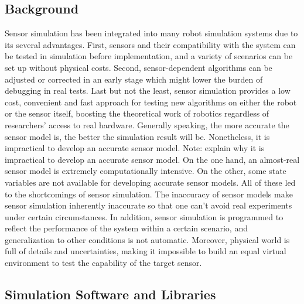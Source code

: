 \documentclass[twocolumn,10pt]{asme2ej}
\begin{document}
\subsection{Background}
Sensor simulation has been integrated into many robot simulation systems due to its several advantages. First, sensors and their compatibility with the system can be tested in simulation before implementation, and a variety of scenarios can be set up without physical costs. Second, sensor-dependent algorithms can be adjusted or corrected in an early stage which might lower the burden of debugging in real tests. Last but not the least, sensor simulation provides a low cost, convenient and fast approach for testing new algorithms on either the robot or the sensor itself, boosting the theoretical work of robotics regardless of researchers' access to real hardware. Generally speaking, the more accurate the sensor model is, the better the simulation result will be. Nonetheless, it is impractical to develop an accurate sensor model. {\color{red} Note: explain why it is impractical to develop an accurate sensor model.} On the one hand, an almost-real sensor model is extremely computationally intensive. On the other, some state variables are not available for developing accurate sensor models. All of these led to the shortcomings of sensor simulation. The inaccuracy of sensor models make sensor simulation inherently inaccurate so that one can't avoid real experiments under certain circumstances. In addition, sensor simulation is programmed to reflect the performance of the system within a certain scenario, and generalization to other conditions is not automatic. Moreover, physical world is full of details and uncertainties, making it impossible to build an equal virtual environment to test the capability of the target sensor.

\subsection{Simulation Software and Libraries}
\end{document}
